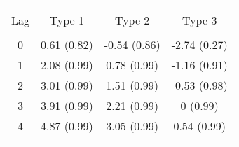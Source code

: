 
\begin{table}[!htbp] \centering 
  \caption{} 
  \label{} 
\begin{tabular}{@{\extracolsep{5pt}} cccc} 
\\[-1.8ex]\hline 
\hline \\[-1.8ex] 
Lag & Type 1 & Type 2 & Type 3 \\ 
\hline \\[-1.8ex] 
0 & 0.61
(0.82) & -0.54
(0.86) & -2.74
(0.27) \\ 
1 & 2.08
(0.99) & 0.78
(0.99) & -1.16
(0.91) \\ 
2 & 3.01
(0.99) & 1.51
(0.99) & -0.53
(0.98) \\ 
3 & 3.91
(0.99) & 2.21
(0.99) & 0
(0.99) \\ 
4 & 4.87
(0.99) & 3.05
(0.99) & 0.54
(0.99) \\ 
\hline \\[-1.8ex] 
\end{tabular} 
\end{table} 
